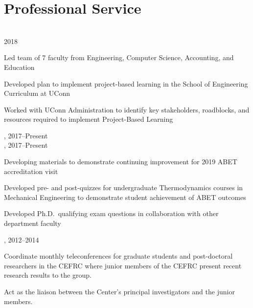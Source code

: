 \section{{\sectionfont Professional Service}}

\\
 \hfill 2018\\

\begin{innerlist}
    \item Led team of 7 faculty from Engineering, Computer Science, Accounting, and Education
    \item Developed plan to implement project-based learning in the School of Engineering Curriculum at UConn
    \item Worked with UConn Administration to identify key stakeholders, roadblocks, and resources required to implement Project-Based Learning
\end{innerlist}

\vspace{\baselineskip}

,  \hfill 2017--Present\\
,  \hfill 2017--Present\\

\begin{innerlist}
    \item Developing materials to demonstrate continuing improvement for 2019 ABET accreditation visit
    \item Developed pre- and post-quizzes for undergraduate Thermodynamics courses in Mechanical Engineering to demonstrate student achievement of ABET outcomes
    \item Developed Ph.D.\ qualifying exam questions in collaboration with other department faculty
\end{innerlist}

\vspace{\baselineskip}

,  \hfill 2012--2014\\

\begin{innerlist}
\item Coordinate monthly teleconferences for graduate students
and post-doctoral researchers in the CEFRC where junior members of
the CEFRC present recent research results to the group.
\item Act as the liaison between the Center's principal investigators
and the junior members.
\end{innerlist}

